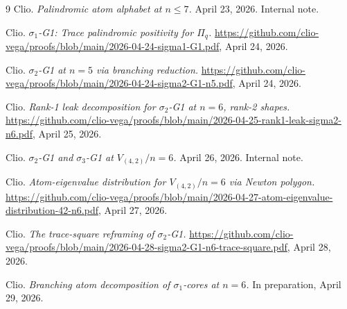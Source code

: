 \documentclass{article}
\theoremstyle{definition}
\begin{document}

\begin{thebibliography}{9}
Clio. \emph{Palindromic atom alphabet at $n\leq 7$.} April 23, 2026. Internal note.

Clio. \emph{$\sigma_1$-G1: Trace palindromic positivity for $\Pi_q$.}
\url{https://github.com/clio-vega/proofs/blob/main/2026-04-24-sigma1-G1.pdf}, April 24, 2026.

Clio. \emph{$\sigma_2$-G1 at $n=5$ via branching reduction.}
\url{https://github.com/clio-vega/proofs/blob/main/2026-04-24-sigma2-G1-n5.pdf}, April 24, 2026.

Clio. \emph{Rank-1 leak decomposition for $\sigma_2$-G1 at $n=6$, rank-2 shapes.}
\url{https://github.com/clio-vega/proofs/blob/main/2026-04-25-rank1-leak-sigma2-n6.pdf}, April 25, 2026.

Clio. \emph{$\sigma_2$-G1 and $\sigma_3$-G1 at $V_{(4,2)}/n=6$.}
April 26, 2026. Internal note.

Clio. \emph{Atom-eigenvalue distribution for $V_{(4,2)}/n=6$ via Newton polygon.}
\url{https://github.com/clio-vega/proofs/blob/main/2026-04-27-atom-eigenvalue-distribution-42-n6.pdf}, April 27, 2026.

Clio. \emph{The trace-square reframing of $\sigma_2$-G1.}
\url{https://github.com/clio-vega/proofs/blob/main/2026-04-28-sigma2-G1-n6-trace-square.pdf}, April 28, 2026.

Clio. \emph{Branching atom decomposition of $\sigma_1$-cores at $n=6$.} In preparation, April 29, 2026.

\end{thebibliography}
\end{document}
